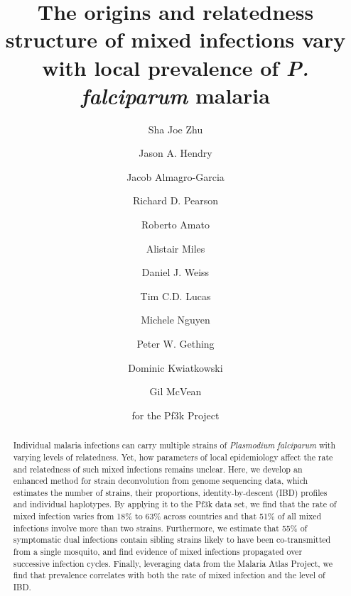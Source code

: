 \documentclass[9pt,lineno]{elife}
\begin{document}
\listoftodos
\clearpage
\setcounter{page}{1}


\title{The origins and relatedness structure of mixed infections vary with local prevalence of {\it P. falciparum} malaria}
\newcommand\shorttitle{Mixed infections in malaria}
\date{}

\author[1$\dagger$]{Sha Joe Zhu}
\author[1$\dagger$]{Jason A. Hendry}
\author[1,2,3,4]{Jacob Almagro-Garcia}

\author[2,3,4]{Richard D. Pearson}
\author[2,3,4]{Roberto Amato}
\author[1,2,3,4]{Alistair Miles}

\author[1]{Daniel J. Weiss}
\author[1]{Tim C.D. Lucas}
\author[1]{Michele Nguyen}


\author[1]{Peter W. Gething}
\author[1,2,3,4]{Dominic Kwiatkowski}
\author[1,3*]{Gil McVean}

\author[5]{for the Pf3k Project}



\maketitle{}

\begin{abstract}
Individual malaria infections can carry multiple strains of {\it Plasmodium falciparum} with varying levels of relatedness.  Yet, how parameters of local epidemiology affect the rate and relatedness of such mixed infections remains unclear.  Here, we develop an enhanced method for strain deconvolution from genome sequencing data, which estimates the number of strains, their proportions, identity-by-descent (IBD) profiles and individual haplotypes.  By applying it to the Pf3k data set, we find that the rate of mixed infection varies from 18\% to 63\% across countries and that 51\% of all mixed infections involve more than two strains.  Furthermore, we estimate that 55\% of symptomatic dual infections contain sibling strains likely to have been co-transmitted from a single mosquito, and find evidence of mixed infections propagated over successive infection cycles.  Finally, leveraging data from the Malaria Atlas Project, we find that prevalence correlates with both the rate of mixed infection and the level of IBD.
\end{abstract}
\end{document}

